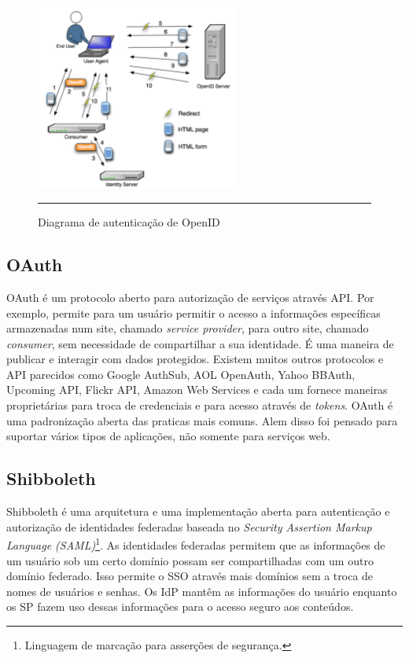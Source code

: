 \begin{figure}[htbp]
  \centering
  \includegraphics[width=0.6\textwidth]{./Figure/OpenID_Scenario.pdf}
  \rule{35em}{0.5pt}
  \caption[Diagrama de autenticação de OpenID]{Diagrama de autenticação de OpenID}
  \label{fig:OpenID}
\end{figure}

\subsection{OAuth}
OAuth é um protocolo aberto para autorização de serviços através
API. Por exemplo, permite para um usuário permitir o acesso a
informações específicas armazenadas num site, chamado \emph{service
  provider}, para outro site, chamado \emph{consumer}, sem necessidade
de compartilhar a sua identidade. É uma maneira de publicar e
interagir com dados protegidos. Existem muitos outros protocolos e API
parecidos como Google AuthSub, AOL OpenAuth, Yahoo
BBAuth, Upcoming API, Flickr API, Amazon Web Services e cada um
fornece maneiras proprietárias para troca de credenciais e para acesso
através de \emph{tokens}. OAuth é uma padronização aberta das praticas
mais comuns. Alem disso foi pensado para suportar vários tipos de
aplicações, não somente para serviços web.

\subsection{Shibboleth}
Shibboleth é uma arquitetura e uma implementação aberta para
autenticação e autorização de identidades federadas baseada no
\emph{Security Assertion Markup Language (SAML)}\footnote{Linguagem de
marcação para asserções de segurança.}. As identidades federadas
permitem que as informações de um usuário sob um certo domínio possam
ser compartilhadas com um outro domínio federado. Isso permite o SSO
através mais domínios sem a troca de nomes de usuários e senhas. Os
IdP mantêm as informações do usuário enquanto os SP fazem uso dessas
informações para o acesso seguro aos conteúdos. 

